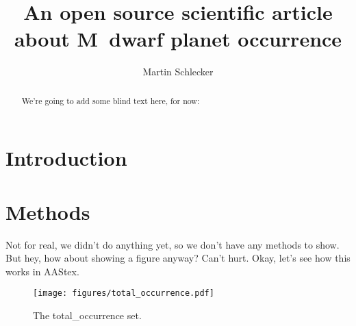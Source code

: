 \documentclass[twocolumn]{aastex631}
\begin{document}
\title{An open source scientific article about M~dwarf planet occurrence}

\author[0000-0000-0000-0000]{Martin Schlecker}

\begin{abstract}
    We're going to add some blind text here, for now:
    \blindtext
\end{abstract}

\section{Introduction}
\Blindtext[4]


\section{Methods}
   Not for real, we didn't do anything yet, so we don't have any methods to show.
    But hey, how about showing a figure anyway?
    Can't hurt. Okay, let's see how this works in AAStex.
\begin{figure}
    \begin{centering}
        \texttt{[image: figures/total\_occurrence.pdf]}
        \caption{The total_occurrence set.}
        \label{fig:total_occurrence}
    \end{centering}
\end{figure}
\end{document}
